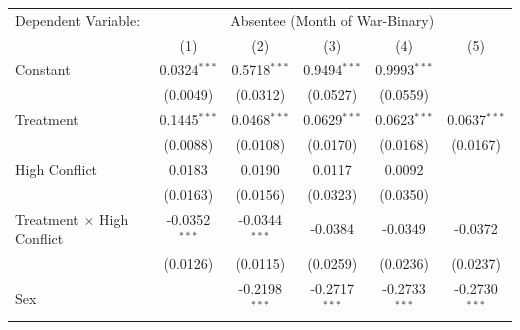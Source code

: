 \begingroup
\centering
\renewcommand{\arraystretch}{0.75}   %
\setlength{\aboverulesep}{0pt}       %
\setlength{\belowrulesep}{0pt} 
\begin{tabular}{lccccc}
   \tabularnewline \midrule \midrule
   Dependent Variable: & \multicolumn{5}{c}{Absentee (Month of War-Binary)}\\
                                                       
                                               & (1)             & (2)                     & (3)                            & (4)                            & (5)\\  
   \midrule
   
   Constant                                          & 0.0324$^{***}$  & 0.5718$^{***}$          & 0.9494$^{***}$                 & 0.9993$^{***}$                 &   \\   
                                                     & (0.0049)        & (0.0312)                & (0.0527)                       & (0.0559)                       &   \\   
   Treatment                                         & 0.1445$^{***}$  & 0.0468$^{***}$          & 0.0629$^{***}$                 & 0.0623$^{***}$                 & 0.0637$^{***}$\\   
                                                     & (0.0088)        & (0.0108)                & (0.0170)                       & (0.0168)                       & (0.0167)\\   
   High Conflict                        & 0.0183          & 0.0190                  & 0.0117                         & 0.0092                         &   \\   
                                                     & (0.0163)        & (0.0156)                & (0.0323)                       & (0.0350)                       &   \\   
   Treatment $\times$ High Conflict     & -0.0352$^{***}$ & -0.0344$^{***}$         & -0.0384                        & -0.0349                        & -0.0372\\   
                                                     & (0.0126)        & (0.0115)                & (0.0259)                       & (0.0236)                       & (0.0237)\\   
   Sex                                               &                 & -0.2198$^{***}$         & -0.2717$^{***}$                & -0.2733$^{***}$                & -0.2730$^{***}$\\   

\end{tabular}
